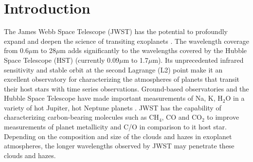 \documentclass{emulateapj}
\begin{document}

\section{Introduction}

The James Webb Space Telescope (JWST) \citep[e.g.][]{gardner2006SSRv} has the potential to profoundly expand and deepen the science of transiting exoplanets \citep[e.g.][]{greene2016jwst_trans}. The wavelength coverage from 0.6$\mu$m to 28$\mu$m adds significantly to the wavelengths covered by the Hubble Space Telescope (HST) (currently 0.09$\mu$m to 1.7$\mu$m). Its unprecedented infrared sensitivity and stable orbit at the second Lagrange (L2) point make it an excellent observatory for characterizing the atmospheres of planets that transit their host stars with time series observations. Ground-based observatories and the Hubble Space Telescope have made important measurements of Na, K, H$_2$O in a variety of hot Jupiter, hot Neptune planets \cite[e.g.][]{snellen2008Na209,kreidberg2014wasp43,fraine2014hatp11,deming13,sing2016continuum}. JWST has the capability of characterizing carbon-bearing molecules such as CH$_4$, CO and CO$_2$ to improve measurements of planet metallicity and C/O in comparison to it host star. Depending on the composition and size of the clouds and hazes in exoplanet atmospheres, the longer wavelengths observed by JWST may penetrate these clouds and hazes.
\end{document}
